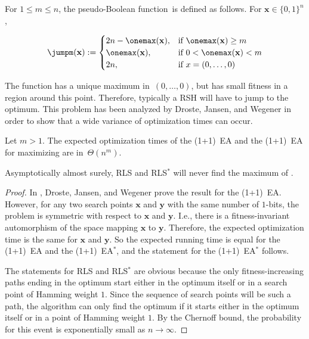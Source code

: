 For $1\leq m\leq n$, the pseudo-Boolean function~\jumpm is defined as follows. For $\mathbf{x}\in\{0,1\}^n$,

\begin{equation}
\jumpm(\mathbf{x}):=\begin{cases}
2n-\onemax(\mathbf{x}), & \text{if } \onemax(\mathbf{x}) \geq m \\
\onemax(\mathbf{x}), & \text{if } 0 < \onemax(\mathbf{x}) < m \\
2n, & \text{if } x=(0,\ldots,0)
\end{cases}
\end{equation}

The function has a unique maximum in~$(0,\ldots,0)$, but has small fitness in a region around this point. Therefore, typically a RSH will have to jump to the optimum. This problem has been analyzed by Droste, Jansen, and Wegener in order to show that a wide variance of optimization times can occur.

\begin{theorem}\label{thm:jumpclassic}
Let $m> 1$. The expected optimization times of the (1+1)~EA and the (1+1)~EA for maximizing \jumpm are in~$\Theta(n^m)$.

Asymptotically almost surely, RLS and RLS$^*$ will never find the maximum of \jumpm.
\end{theorem}
\begin{proof}
In \cite{djwea02}, Droste, Jansen, and Wegener prove the result for the (1+1)~EA. However, for any two search points $\mathbf{x}$ and $\mathbf{y}$ with the same number of $1$-bits, the problem is symmetric with respect to $\mathbf{x}$ and $\mathbf{y}$. I.e., there is a fitness-invariant automorphism of the space mapping $\mathbf{x}$ to $\mathbf{y}$. Therefore, the expected optimization time is the same for $\mathbf{x}$ and $\mathbf{y}$. So the expected running time is equal for the (1+1)~EA and the (1+1)~EA$^*$, and the statement for the (1+1)~EA$^*$ follows.

The statements for RLS and RLS$^*$ are obvious because the only fitness-increasing paths ending in the optimum start either in the optimum itself or in a search point of Hamming weight $1$. Since the sequence of search points will be such a path, the algorithm can only find the optimum if it starts either in the optimum itself or in a point of Hamming weight $1$. By the Chernoff bound, the probability for this event is exponentially small as $n\rightarrow \infty$.
\end{proof}


